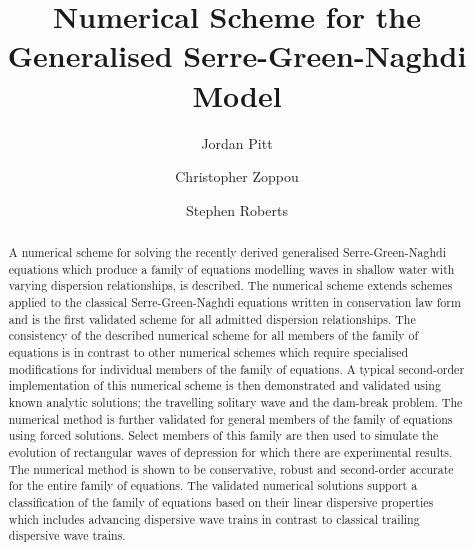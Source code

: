 \documentclass[10pt]{elsarticle}
\begin{document}
	

\begin{frontmatter}

\title{Numerical Scheme for the Generalised Serre-Green-Naghdi Model}
\author[label1]{Jordan Pitt}
\author[label1]{Christopher Zoppou}
\author[label1]{Stephen Roberts}
\address[label1]{Australian National University, Canberra}

\begin{abstract}
A numerical scheme for solving the recently derived generalised Serre-Green-Naghdi equations which produce a family of equations modelling waves in shallow water with varying dispersion relationships, is described. The numerical scheme extends schemes applied to the classical Serre-Green-Naghdi equations written in conservation law form and is the first validated scheme for all admitted dispersion relationships. The consistency of the described numerical scheme for all members of the family of equations is in contrast to other numerical schemes which require specialised modifications for individual members of the family of equations. A typical second-order implementation of this numerical scheme is then demonstrated and validated using known analytic solutions; the travelling solitary wave and the dam-break problem. The numerical method is further validated for general members of the family of equations using forced solutions. Select members of this family are then used to simulate the evolution of rectangular waves of depression for which there are experimental results. The numerical method is shown to be conservative, robust and second-order accurate for the entire family of equations. The validated numerical solutions support a classification of the family of equations based on their linear dispersive properties which includes advancing dispersive wave trains in contrast to classical trailing dispersive wave trains.
\end{abstract}



\end{frontmatter}

\end{document}
